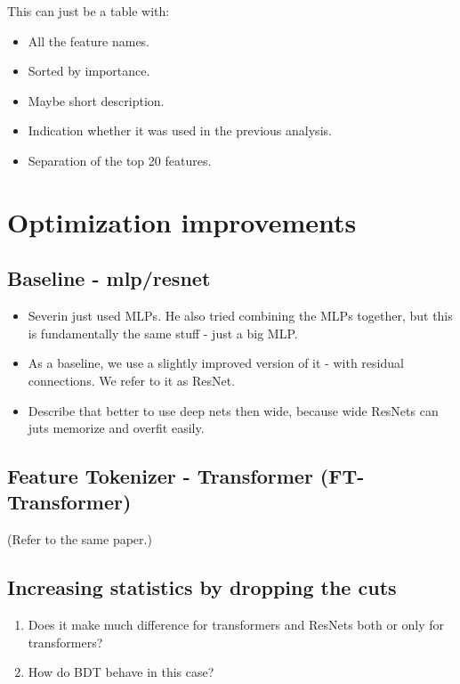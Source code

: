 \documentclass[twoside,draft,a4paper]{article}
\begin{document}
This can just be a table with:

\begin{itemize}
    \item All the feature names.
    \item Sorted by importance.
    \item Maybe short description.
    \item Indication whether it was used in the previous analysis.
    \item Separation of the top 20 features.
\end{itemize}



\section{Optimization improvements}


\subsection{Baseline - mlp/resnet}

\begin{itemize}
    \item Severin just used MLPs. He also tried combining the MLPs together, but this is fundamentally the same stuff -
          just a big MLP.
    \item As a baseline, we use a slightly improved version of it - with residual connections. We refer to it as ResNet.
    \item Describe that better to use deep nets then wide, because wide ResNets can juts memorize and overfit easily.
\end{itemize}


\subsection{Feature Tokenizer - Transformer (FT-Transformer)}

(Refer to the same paper.)


\subsection{Increasing statistics by dropping the cuts}

\begin{enumerate}
    \item Does it make much difference for transformers and ResNets both or only for transformers?
    \item How do BDT behave in this case?
\end{enumerate}
\end{document}
